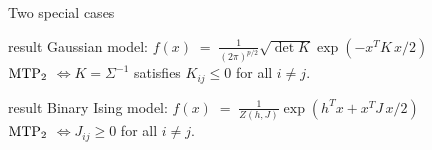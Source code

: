 \documentclass[dvipsnames,aspectratio=169]{beamer} %
\newcommand{\indep}{\mbox{\,$\perp\!\!\!\perp$\,}}
\newcommand{\mtp}{{\rm MTP}_{2}}
\begin{document}
%



\begin{frame}{Two special cases}
\begin{beamercolorbox}[wd=\paperwidth,sep=5pt]{result}
	\alert{Gaussian model}: $f(x)\;=\;\tfrac{1}{(2\pi)^{p/2}}\sqrt{\det K}\exp(-x^T\!K\,x/2)$\\[.2cm]
$\mtp$ \quad$\Longleftrightarrow$\quad $K=\Sigma^{-1}$ satisfies $K_{ij}\leq 0$ for all $i\neq j$.
\end{beamercolorbox}
\bigskip
\begin{beamercolorbox}[wd=\paperwidth,sep=5pt]{result}
	\alert{Binary Ising model}: $f(x)\;=\;\tfrac{1}{Z(h,J)}\exp(h^Tx+x^T\!J\,x/2)$\\[.2cm]
$\mtp$ \quad$\Longleftrightarrow$\quad $J_{ij}\geq 0$ for all $i\neq j$.
\end{beamercolorbox}
\end{frame}
\end{document}
